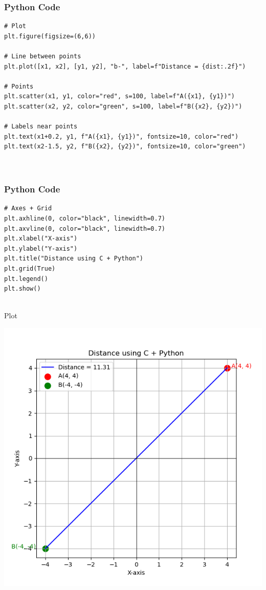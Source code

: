 \documentclass{beamer}
\begin{document}
\begin{frame}[fragile]
    \frametitle{Python Code}

    \begin{lstlisting}
# Plot
plt.figure(figsize=(6,6))

# Line between points
plt.plot([x1, x2], [y1, y2], "b-", label=f"Distance = {dist:.2f}")

# Points
plt.scatter(x1, y1, color="red", s=100, label=f"A({x1}, {y1})")
plt.scatter(x2, y2, color="green", s=100, label=f"B({x2}, {y2})")

# Labels near points
plt.text(x1+0.2, y1, f"A({x1}, {y1})", fontsize=10, color="red")
plt.text(x2-1.5, y2, f"B({x2}, {y2})", fontsize=10, color="green")



    \end{lstlisting}
\end{frame}
\begin{frame}[fragile]
    \frametitle{Python Code}

    \begin{lstlisting}
# Axes + Grid
plt.axhline(0, color="black", linewidth=0.7)
plt.axvline(0, color="black", linewidth=0.7)
plt.xlabel("X-axis")
plt.ylabel("Y-axis")
plt.title("Distance using C + Python")
plt.grid(True)
plt.legend()
plt.show()


    \end{lstlisting}
\end{frame}



\begin{frame}{Plot}
    \begin{center}
        \includegraphics[width=\columnwidth, height=0.8\textheight, keepaspectratio]{figs/figure1.png}
    \end{center}
\end{frame}
\end{document}

